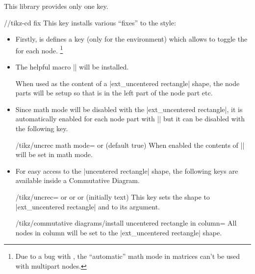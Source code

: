 This library provides only one key.
\begin{stylekey}{/\tikzext/tikz-cd fix}
This key installs various \enquote{fixes} to the  style:

\begin{itemize}
\item Firstly, is defines a  key (only for the  environment)
      which allows to toggle the  for each node.%
      \footnote{Due to a bug with , the \enquote{automatic} math mode in matrices can't be used
        with multipart nodes.}
\item The helpful macro |\uncrec| will be installed.
\begin{command}{\uncrec{}}
  When used as the content of a |ext_uncentered rectangle| shape,
  the node parts will be setup so that  is in the left part of the node part etc.
\end{command}
\item Since math mode will be disabled with the |ext_uncentered rectangle|, it is automatically enabled for each node part with |\uncrec| but it can be disabled with the following key.
\begin{key}{/tikz/uncrec math mode=\textrm{ or } (default true)}
When enabled the contents of |\uncrec| will be set in math mode.
\end{key}
\item For easy access to the |uncentered rectangle| shape, the following keys are available inside a Commutative Diagram.
\begin{stylekey}{/tikz/uncrec=\textrm{ or }\textrm{ or }\textrm{ or } (initially text)}
This key sets the shape to |ext_uncentered rectangle| and  to its argument.
\end{stylekey}
\begin{stylekey}{/tikz/commutative diagrams/install uncentered rectangle in column=}
All nodes in column  will be set to the |ext_uncentered rectangle| shape.
\end{stylekey}
\end{itemize}
\end{stylekey}

